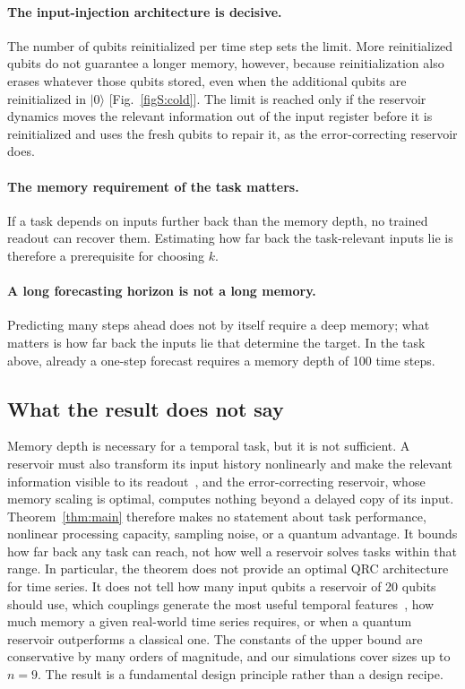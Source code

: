 \documentclass[aps,prl,twocolumn,superscriptaddress,floatfix]{revtex4-2}
\theoremstyle{plain}
\newcommand{\ket}[1]{|#1\rangle}
\begin{document}
\paragraph*{The input-injection architecture is decisive.} The number of qubits reinitialized per time step sets the limit. More reinitialized qubits do not guarantee a longer memory, however, because reinitialization also erases whatever those qubits stored, even when the additional qubits are reinitialized in $\ket0$ [Fig.~\ref{figS:cold}]. The limit is reached only if the reservoir dynamics moves the relevant information out of the input register before it is reinitialized and uses the fresh qubits to repair it, as the error-correcting reservoir does.

\paragraph*{The memory requirement of the task matters.} If a task depends on inputs further back than the memory depth, no trained readout can recover them. Estimating how far back the task-relevant inputs lie is therefore a prerequisite for choosing $k$.

\paragraph*{A long forecasting horizon is not a long memory.} Predicting many steps ahead does not by itself require a deep memory; what matters is how far back the inputs lie that determine the target. In the task above, already a one-step forecast requires a memory depth of 100 time steps.

\subsection{What the result does not say}

Memory depth is necessary for a temporal task, but it is not sufficient. A reservoir must also transform its input history nonlinearly and make the relevant information visible to its readout~\cite{Cao2026}, and the error-correcting reservoir, whose memory scaling is optimal, computes nothing beyond a delayed copy of its input. Theorem~\ref{thm:main} therefore makes no statement about task performance, nonlinear processing capacity, sampling noise, or a quantum advantage. It bounds how far back any task can reach, not how well a reservoir solves tasks within that range. In particular, the theorem does not provide an optimal QRC architecture for time series. It does not tell how many input qubits a reservoir of 20 qubits should use, which couplings generate the most useful temporal features~\cite{MartinezPena2021,Cao2026}, how much memory a given real-world time series requires, or when a quantum reservoir outperforms a classical one. The constants of the upper bound are conservative by many orders of magnitude, and our simulations cover sizes up to $n=9$. The result is a fundamental design principle rather than a design recipe.
\end{document}
